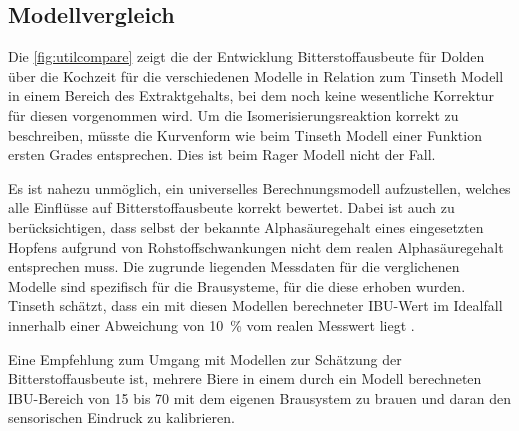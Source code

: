 \documentclass[a4paper,parskip=half]{scrartcl}
\begin{document}
\subsection*{Modellvergleich}

Die \autoref{fig:utilcompare} zeigt die der Entwicklung Bitterstoffausbeute für Dolden über die Kochzeit für die verschiedenen Modelle in Relation zum Tinseth Modell in einem Bereich des Extraktgehalts, bei dem noch keine wesentliche Korrektur für diesen vorgenommen wird. Um die Isomerisierungsreaktion korrekt zu beschreiben, müsste die Kurvenform wie beim Tinseth Modell einer Funktion ersten Grades entsprechen. Dies ist beim Rager Modell nicht der Fall.

Es ist nahezu unmöglich, ein universelles Berechnungsmodell aufzustellen, welches alle Einflüsse auf Bitterstoffausbeute korrekt bewertet. Dabei ist auch zu berücksichtigen, dass selbst der bekannte Alphasäuregehalt eines eingesetzten Hopfens aufgrund von Rohstoffschwankungen nicht dem realen Alphasäuregehalt entsprechen muss. Die zugrunde liegenden Messdaten für die verglichenen Modelle sind spezifisch für die Brausysteme, für die diese erhoben wurden. Tinseth schätzt, dass ein mit diesen Modellen berechneter IBU-Wert im Idealfall innerhalb einer Abweichung von 10~\% vom realen Messwert liegt \parencite[22:05-23:00]{Smith2011}.

Eine Empfehlung zum Umgang mit Modellen zur Schätzung der Bitterstoffausbeute ist, mehrere Biere in einem durch ein Modell berechneten IBU-Bereich von 15 bis 70 mit dem eigenen Brausystem zu brauen und daran den sensorischen Eindruck zu kalibrieren. \parencite{Beechum2017}
\end{document}
